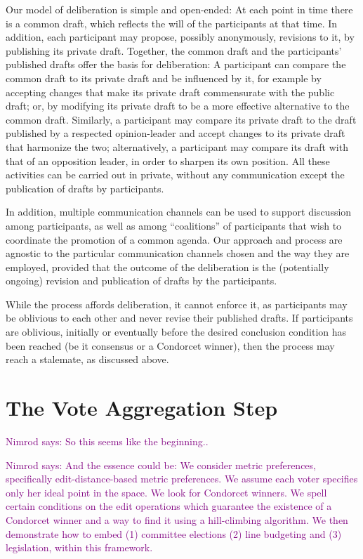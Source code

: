 \documentclass{llncs}
\newcommand{\nimrod}[1]{\textcolor{purple}{Nimrod says: #1}}
\begin{document}
Our model of deliberation is simple and open-ended:  At each point in time there is a common draft, which reflects the will of the participants at that time.  In addition, each participant may propose, possibly anonymously, revisions to it, by publishing its private draft. Together, the common draft and the participants' published drafts offer the basis for deliberation:  A participant can compare the common draft to its private draft and be influenced by it, for example by accepting changes that make its private draft commensurate with the public draft; or, by modifying its private draft to be a more effective alternative to the common draft.  Similarly, a participant may compare its private draft to the draft published by a respected opinion-leader and accept changes to its private draft that harmonize the two; alternatively, a participant may compare its draft with that of an opposition leader, in order to sharpen its own position.  All these activities can be carried out in private, without any communication except the publication of drafts by participants.

In addition, multiple communication channels can be used to support discussion among participants, as well as among ``coalitions'' of participants that wish to coordinate the promotion of a common agenda.  Our approach and process are agnostic to the particular communication channels chosen and the way they are employed, provided that the outcome of the deliberation is the (potentially ongoing) revision and publication of drafts by the participants.

While the process affords deliberation, it cannot enforce it, as participants may be oblivious to each other and never revise their published drafts. If participants are oblivious, initially or eventually before the desired conclusion condition has been reached (be it consensus or a Condorcet winner), then the process may reach a stalemate, as discussed above.


\section{The Vote Aggregation Step}
\label{section:voting step}

\nimrod{So this seems like the beginning..}

\nimrod{And the essence could be: We consider metric preferences, specifically edit-distance-based metric preferences. We assume each voter specifies only her ideal point in the space. We look for Condorcet winners. We spell certain conditions on the edit operations which guarantee the existence of a Condorcet winner and a way to find it using a hill-climbing algorithm. We then demonstrate how to embed (1) committee elections (2) line budgeting and (3) legislation, within this framework.}
\end{document}

